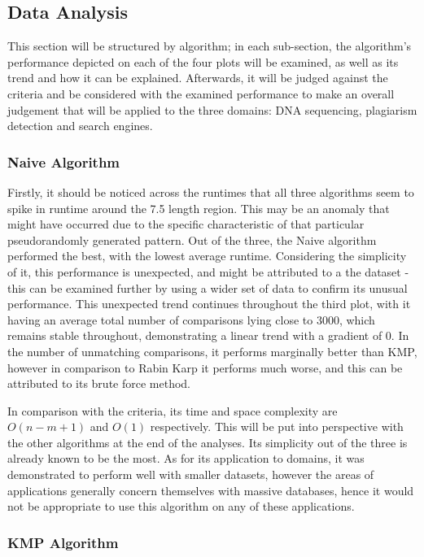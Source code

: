 \documentclass[12pt]{article}
\begin{document}
\subsection{Data Analysis}
This section will be structured by algorithm; in each sub-section, the algorithm's performance depicted on each of the four plots will be examined, as well as its trend and how it can be explained.
Afterwards, it will be judged against the criteria and be considered with the examined performance to make an overall judgement that will be applied to the three domains: DNA sequencing, plagiarism detection and search engines.

\subsubsection{Naive Algorithm}

Firstly, it should be noticed across the runtimes that all three algorithms seem to spike in runtime around the 7.5 length region. This may be an anomaly that might have occurred due to the specific characteristic of that particular pseudorandomly generated pattern. Out of the three, the Naive algorithm performed the best, with the lowest average runtime. Considering the simplicity of it, this performance is unexpected, and might be attributed to a the dataset - this can be examined further by using a wider set of data to confirm its unusual performance. This unexpected trend continues throughout the third plot, with it having an average total number of comparisons lying close to 3000, which remains stable throughout, demonstrating a linear trend with a gradient of 0. In the number of unmatching comparisons, it performs marginally better than KMP, however in comparison to Rabin Karp it performs much worse, and this can be attributed to its brute force method.

In comparison with the criteria, its time and space complexity are $O(n-m+1)$ and $O(1)$ respectively. This will be put into perspective with the other algorithms at the end of the analyses. Its simplicity out of the three is already known to be the most. As for its application to domains, it was demonstrated to perform well with smaller datasets, however the areas of applications generally concern themselves with massive databases, hence it would not be appropriate to use this algorithm on any of these applications.

\subsubsection{KMP Algorithm}
\end{document}
